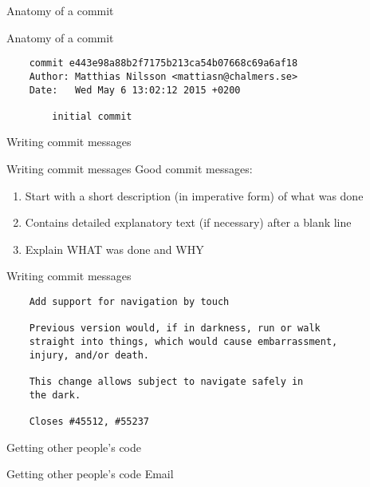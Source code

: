 \documentclass{beamer}
\begin{document}
\begin{frame}{}
  \center
  \Huge Anatomy of a commit
\end{frame}

\begin{frame}[fragile]{Anatomy of a commit}
  \begin{verbatim}
    commit e443e98a88b2f7175b213ca54b07668c69a6af18
    Author: Matthias Nilsson <mattiasn@chalmers.se>
    Date:   Wed May 6 13:02:12 2015 +0200

        initial commit
  \end{verbatim}
\end{frame}

\begin{frame}{}
  \center
  \Huge Writing commit messages
\end{frame}

\begin{frame}{Writing commit messages}
  Good commit messages:
  \begin{enumerate}
    \item Start with a short description (in imperative form) of what was done
    \item Contains detailed explanatory text (if necessary) after a blank line
    \item Explain WHAT was done and WHY
  \end{enumerate}
\end{frame}

\begin{frame}[fragile]{Writing commit messages}
  \begin{verbatim}
    Add support for navigation by touch

    Previous version would, if in darkness, run or walk
    straight into things, which would cause embarrassment,
    injury, and/or death.

    This change allows subject to navigate safely in
    the dark.

    Closes #45512, #55237
  \end{verbatim}
\end{frame}

\begin{frame}{}
  \center
  \Huge Getting other people's code
\end{frame}

\begin{frame}{Getting other people's code}
  \center
  \Huge Email
\end{frame}
\end{document}
